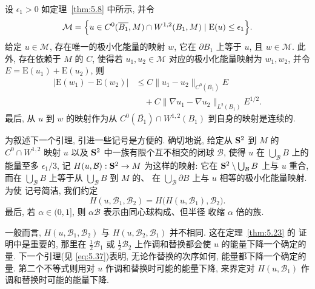 \begin{corollary}
\label{cor:5.10}
设 $\epsilon_1>0$ 如定理~\ref{thm:5.8} 中所示, 并令
\begin{equation}
\mathcal{M}=\Bigl\{u\in C^0(\overline{B_1},M)\cap W^{1,2}(B_1,M)
\mid \mathrm{E}(u)\leq\epsilon_1\Bigr\}.
\label{eq:5.34}
\end{equation}
给定 $u\in\mathcal{M}$, 存在唯一的极小化能量的映射 $w$, 它在
$\partial B_1$ 上等于 $u$, 且 $w\in\mathcal{M}$. 此外, 存在依赖于 $M$
的 $C$, 使得若 $u_1,u_2\in\mathcal{M}$ 对应的极小化能量映射为 $w_1,w_2$,
并令 $E=\mathrm{E}(u_1)+\mathrm{E}(u_2)$, 则
\begin{equation}
\begin{aligned}
\bigl|\mathrm{E}(w_1)-\mathrm{E}(w_2)\bigr|
&\leq C\|u_1-u_2\|_{C^0(\overline{B_1})}E\\
&\quad +C\|\nabla u_1-\nabla u_2\|_{L^2(B_1)}E^{1/2}.
\end{aligned}
\label{eq:5.35}
\end{equation}
最后, 从 $u$ 到 $w$ 的映射作为从
$C^0(\overline{B_1})\cap W^{1,2}(B_1)$ 到自身的映射是连续的.
\end{corollary}

为叙述下一个引理, 引进一些记号是方便的. 确切地说, 给定从 $\mathbf{S}^2$ 到 $M$
的 $C^0\cap W^{1,2}$ 映射 $u$ 以及 $\mathbf{S}^2$ 中一族有限个互不相交的闭球
$\mathcal{B}$, 使得 $u$ 在 $\bigcup_{\mathcal{B}}B$ 上的能量至多
$\epsilon_1/3$, 记 $H(u,\mathcal{B}):\mathbf{S}^2\to M$ 为这样的映射: 它在
$\mathbf{S}^2\setminus\bigcup_{\mathcal{B}}B$ 上与 $u$ 重合, 而在
$\bigcup_{\mathcal{B}}B$ 上等于从 $\bigcup_{\mathcal{B}}B$ 到 $M$ 的、
在 $\bigcup_{\mathcal{B}}\partial B$ 上与 $u$ 相等的极小化能量映射. 为使
记号简洁, 我们约定
\begin{equation}
H(u,\mathcal{B}_1,\mathcal{B}_2)=H\bigl(H(u,\mathcal{B}_1),\mathcal{B}_2\bigr).
\label{eq:5.36}
\end{equation}
最后, 若 $\alpha\in(0,1]$, 则 $\alpha\mathcal{B}$ 表示由同心球构成、但半径
收缩 $\alpha$ 倍的族.

一般而言, $H(u,\mathcal{B}_1,\mathcal{B}_2)$ 与
$H(u,\mathcal{B}_2,\mathcal{B}_1)$ 并不相同. 这在定理~\ref{thm:5.23} 的
证明中是重要的, 那里在 $\frac12\mathcal{B}_1$ 或 $\frac12\mathcal{B}_2$
上作调和替换都会使 $u$ 的能量下降一个确定的量. 下一个引理(见
\eqref{eq:5.37})表明, 无论作替换的次序如何, 能量都下降一个确定的量.
第二个不等式则用对 $u$ 作调和替换时可能的能量下降, 来界定对
$H(u,\mathcal{B}_1)$ 作调和替换时可能的能量下降.

